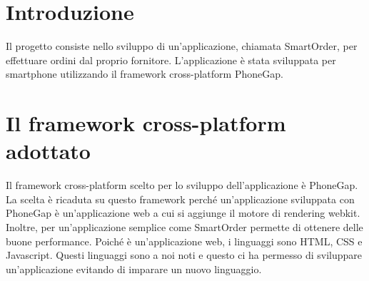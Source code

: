 \documentclass[12pt, a4paper, titlepage]{report}
\begin{document}
	
	\begin{frontespizio}
		\begin{Preambolo*}
			\usepackage{fourier}
		\end{Preambolo*}
	\end{frontespizio}
	
	\setcounter{page}{2}
	\tableofcontents
	\newpage
	\listoffigures
	\newpage
	\listoftables
	\setcounter{table}{0}
	\newpage	    
	\renewcommand*{\arraystretch}{2}
	\pagestyle{fancy}
	\fancyhf{}
	\cfoot{\thepage}
	
	\section{Introduzione}
	Il progetto consiste nello sviluppo di un'applicazione, chiamata SmartOrder, per effettuare ordini dal proprio fornitore. L'applicazione è stata sviluppata per smartphone utilizzando il framework cross-platform PhoneGap.
	
	\section{Il framework cross-platform adottato}
	Il framework cross-platform scelto per lo sviluppo dell'applicazione è PhoneGap. La scelta è ricaduta su questo framework perché un'applicazione sviluppata con PhoneGap è un'applicazione web a cui si aggiunge il motore di rendering webkit. Inoltre, per un'applicazione semplice come SmartOrder permette di ottenere delle buone performance.
	Poiché è un'applicazione web, i linguaggi sono HTML, CSS e Javascript. Questi linguaggi sono a noi noti e questo ci ha permesso di sviluppare un'applicazione evitando di imparare un nuovo linguaggio.
	
\end{document}
